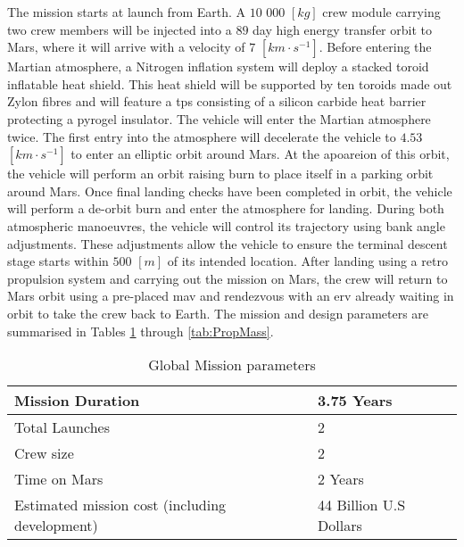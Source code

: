 The mission starts at launch from Earth. A $10$ $000$ $[kg]$ crew module carrying two crew members will be injected into a $89$ day high energy transfer orbit to Mars, where it will arrive with a velocity of $7$ $[km\cdot s^{-1}]$. Before entering the Martian atmosphere, a Nitrogen inflation system will deploy a stacked toroid inflatable heat shield. This heat shield will be supported by ten toroids made out Zylon fibres and will feature a \gls{tps} consisting of a silicon carbide heat barrier protecting a pyrogel insulator. The vehicle will enter the Martian atmosphere twice. The first entry into the atmosphere will decelerate the vehicle to $4.53$ $[km\cdot s^{-1}]$ to enter an elliptic orbit around Mars. At the apoareion of this orbit, the vehicle will perform an orbit raising burn to place itself in a parking orbit around Mars. Once final landing checks have been completed in orbit, the vehicle will perform a de-orbit burn and enter the atmosphere for landing. During both atmospheric manoeuvres, the vehicle will control its trajectory using bank angle adjustments. These adjustments allow the vehicle to ensure the terminal descent stage starts within $500$ $[m]$ of its intended location. After landing using a retro propulsion system and carrying out the mission on Mars, the crew will return to Mars orbit using a pre-placed \gls{mav} and rendezvous with an \gls{erv} already waiting in orbit to take the crew back to Earth. The mission and design parameters are summarised in Tables \ref{tab:MissionPar} through \ref{tab:PropMass}.


\begin{table}[H]
	\centering
	\caption{Global Mission parameters}
	\label{tab:MissionPar}
	\begin{tabular}{|p{}|p{}|} \hline
		Mission Duration				             	& 	3.75 Years						\\ \hline 
		Total Launches       							&	2  		   	  					\\ \hline
		Crew size				 						&	2     	  						\\ \hline
		Time on Mars				              	   	&  	2 Years    						\\ \hline
		Estimated mission cost (including development) 	&  	44 Billion U.S Dollars			\\ \hline
	\end{tabular}
\end{table}

